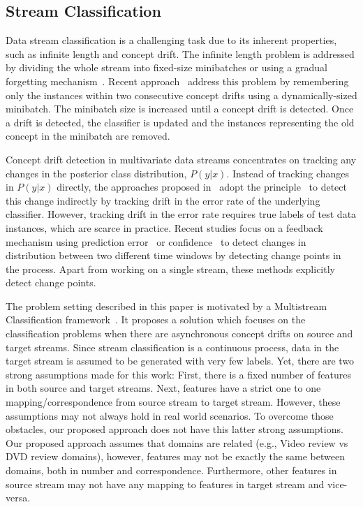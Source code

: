 \subsection{Stream Classification}
Data stream classification is a challenging task due to its inherent properties, such as infinite length and concept drift. The infinite length problem is addressed by dividing the whole stream into fixed-size minibatches or using a gradual forgetting mechanism~\cite{journals/icdm/MasudGKHT08}. Recent approach~\cite{conf/sdm/BifetG07} address this problem by remembering only the instances within two consecutive concept drifts using a dynamically-sized minibatch. The minibatch size is increased until a concept drift is detected. Once a drift is detected, the classifier is updated and the instances representing the old concept in the minibatch are removed.

Concept drift detection in multivariate data streams concentrates on tracking any changes in the posterior class distribution, $P(y|x)$. Instead of tracking changes in $P(y|x)$ directly, the approaches proposed in~\cite{conf/sbia/GamaMCR04} adopt the principle~\cite{haque2018framework} to detect this change indirectly by tracking drift in the error rate of the underlying classifier. However, tracking drift in the error rate requires true labels of test data instances, which are scarce in practice. Recent studies focus on a feedback mechanism using prediction error~\cite{conf/sbia/GamaMCR04} or confidence~\cite{chandra2016adaptive} to detect changes in distribution between two different time windows by detecting change points in the process. Apart from working on a single stream, these methods explicitly detect change points.

The problem setting described in this paper is motivated by a Multistream Classification framework~\cite{chandra2016adaptive}. It proposes a solution which focuses on the classification problems when there are asynchronous concept drifts on source and target streams. Since stream classification is a continuous process, data in the target stream is assumed to be generated with very few labels. Yet, there are two strong assumptions made for this work: First, there is a fixed number of features in both source and target streams. Next, features have a strict one to one mapping/correspondence from source stream to target stream. However, these assumptions may not always hold in real world scenarios. To overcome those obstacles, our proposed approach does not have this latter strong assumptions. Our proposed approach assumes that domains are related (e.g., Video review vs DVD review domains), however,  features may not be exactly the same between domains, both in number and correspondence. Furthermore, other features in source stream may not have any mapping to features in target stream and vice-versa. 


